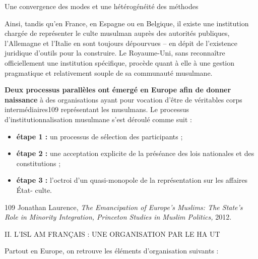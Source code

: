 Une convergence des modes et une hétérogénéité des méthodes


Ainsi, tandis qu'en France, en Espagne ou en Belgique, il existe une
institution chargée de représenter le culte musulman auprès des
autorités publiques, l'Allemagne et l'Italie en sont toujours dépourvues
-- en dépit de l'existence juridique d'outils pour la construire. Le
Royaume-Uni, sans reconnaître officiellement une institution spécifique,
procède quant à elle à une gestion pragmatique et relativement souple de
sa communauté musulmane.

\textbf{Deux processus parallèles ont émergé en Europe afin de donner
naissance} à des organisations ayant pour vocation d'être de véritables
corps intermédiaires109 représentant les musulmans. Le processus
d'institutionnalisation musulmane s'est déroulé comme suit :


\begin{itemize}
\item
  \textbf{étape 1 :} un processus de sélection des participants ;
\item
  \textbf{étape 2 :} une acceptation explicite de la préséance des lois
  nationales et des constitutions ;
\item
  \textbf{étape 3 :} l'octroi d'un quasi-monopole de la représentation
  sur les affaires État- culte.
\end{itemize}


109 Jonathan Laurence, \emph{The Emancipation of Europe's Muslims: The
State's Role in Minority Integration, Princeton Studies in Muslim
Politics,} 2012.

II. L'ISL AM FRANÇAIS : UNE ORGANISATION PAR LE HA UT

Partout en Europe, on retrouve les éléments d'organisation suivants :


